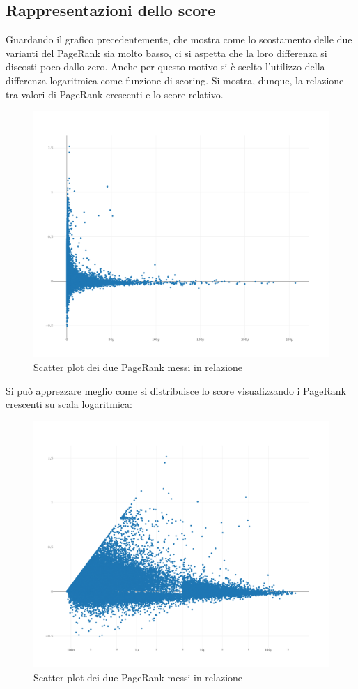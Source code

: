\documentclass[a4paper, 12pt]{article}
\begin{document}
\subsection{Rappresentazioni dello score}
Guardando il grafico precedentemente, che mostra come lo scostamento delle due varianti del PageRank sia molto basso, ci si aspetta che la loro differenza si discosti poco dallo zero. Anche per questo motivo si è scelto l'utilizzo della differenza logaritmica come funzione di scoring. Si mostra, dunque, la relazione tra valori di PageRank crescenti e lo score relativo.
\begin{figure}[H]
  \includegraphics[width=\linewidth]{images/grafico-2.png}
  \caption{Scatter plot dei due PageRank messi in relazione}
\end{figure}
Si può apprezzare meglio come si distribuisce lo score visualizzando i PageRank crescenti su scala logaritmica:
\begin{figure}[H]
  \includegraphics[width=\linewidth]{images/grafico-3.png}
  \caption{Scatter plot dei due PageRank messi in relazione}
\end{figure}
\end{document}
